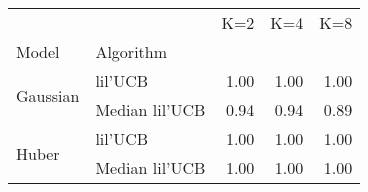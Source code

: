 \begin{tabular}{llrrr}
\toprule
      &                &   K=2 &   K=4 &   K=8 \\
Model & Algorithm &       &       &       \\
\midrule
\multirow{2}{*}{Gaussian} & lil'UCB &  1.00 &  1.00 &  1.00 \\
      & Median lil'UCB &  0.94 &  0.94 &  0.89 \\
\cline{1-5}
\multirow{2}{*}{Huber} & lil'UCB &  1.00 &  1.00 &  1.00 \\
      & Median lil'UCB &  1.00 &  1.00 &  1.00 \\
\bottomrule
\end{tabular}
